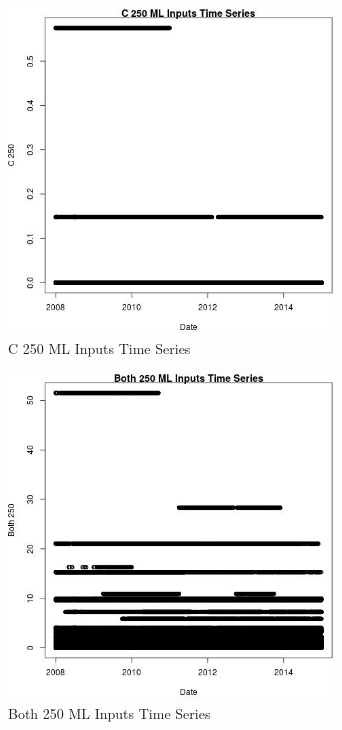 \begin{figure} 
\centering  
\includegraphics[width=0.77\textwidth]{Code_Outputs/ML_input_report_ML_input_PM25_Step5_part_d_de_duplicated_aves_ML_input_C_250vDate.jpg} 
\caption{\label{fig:ML_input_report_ML_input_PM25_Step5_part_d_de_duplicated_aves_ML_inputC_250vDate}C 250 ML Inputs Time Series} 
\end{figure} 
 

\clearpage 

\begin{figure} 
\centering  
\includegraphics[width=0.77\textwidth]{Code_Outputs/ML_input_report_ML_input_PM25_Step5_part_d_de_duplicated_aves_ML_input_Both_250vDate.jpg} 
\caption{\label{fig:ML_input_report_ML_input_PM25_Step5_part_d_de_duplicated_aves_ML_inputBoth_250vDate}Both 250 ML Inputs Time Series} 
\end{figure} 
 

